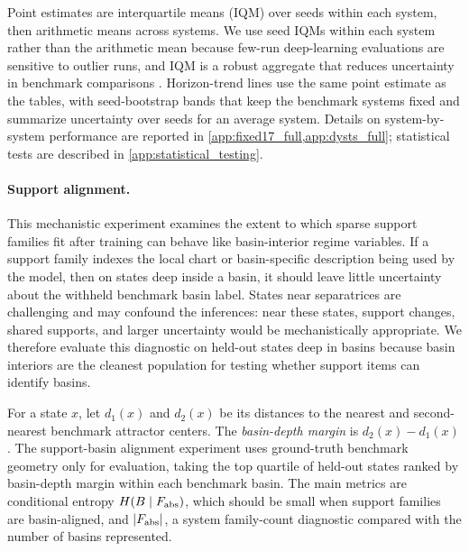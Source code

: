 \documentclass[11pt]{article}
\theoremstyle{plain}
\theoremstyle{definition}
\begin{document}
Point estimates are interquartile means (IQM) over seeds within each system, then arithmetic means across systems. We use seed IQMs within each system rather than the arithmetic mean because few-run deep-learning evaluations are sensitive to outlier runs, and IQM is a robust aggregate that reduces uncertainty in benchmark comparisons \citep{agarwal2021deep}.
Horizon-trend lines use the same point estimate as the tables, with seed-bootstrap bands that keep the benchmark systems fixed and summarize uncertainty over seeds for an average system.
Details on system-by-system performance are reported in \cref{app:fixed17_full,app:dysts_full}; statistical tests are described in \cref{app:statistical_testing}.
\paragraph{Support alignment.} This mechanistic experiment examines the extent to which sparse support families fit after training can behave like basin-interior regime variables.
If a support family indexes the local chart or basin-specific description being used by the model, then on states deep inside a basin, it should leave little uncertainty about the withheld benchmark basin label.
States near separatrices are challenging and may confound the inferences: near these states, support changes, shared supports, and larger uncertainty would be mechanistically appropriate.
We therefore evaluate this diagnostic on held-out states deep in basins because basin interiors are the cleanest population for testing whether support items can identify basins.

For a state \(x\), let \(d_1(x)\) and \(d_2(x)\) be its distances to the nearest and second-nearest benchmark attractor centers. The \textit{basin-depth margin} is \(d_2(x)-d_1(x)\).
The support-basin alignment experiment uses ground-truth benchmark geometry only for evaluation, taking the top quartile of held-out states ranked by basin-depth margin within each benchmark basin.
The main metrics are conditional entropy \(H(B\mid F_{\rm abs})\), which should be small when support families are basin-aligned, and \(|F_{\rm abs}|\), a system family-count diagnostic compared with the number of basins represented.
\end{document}
